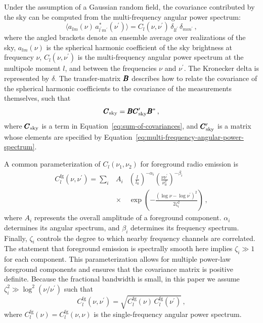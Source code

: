 \begin{bibunit}
Under the assumption of a Gaussian random field, the covariance contributed by the sky can be
computed from the multi-frequency angular power spectrum:
\begin{equation}\label{eq:multi-frequency-angular-power-spectrum}
    \langle a_{lm}(\nu) \, a_{l^\prime m^\prime}^*(\nu^\prime)\rangle
        = C_l(\nu, \nu^\prime) \, \delta_{ll^\prime} \, \delta_{mm^\prime}\,,
\end{equation}
where the angled brackets denote an ensemble average over realizations of the sky, $a_{lm}(\nu)$ is
the spherical harmonic coefficient of the sky brightness at frequency $\nu$, $C_l(\nu, \nu^\prime)$
is the multi-frequency angular power spectrum at the multipole moment $l$, and between the
frequencies $\nu$ and $\nu^\prime$. The Kronecker delta is represented by $\delta$.  The
transfer-matrix $\pmb B$ describes how to relate the covariance of the spherical harmonic coefficients
to the covariance of the measurements themselves, such that
\begin{equation}\label{eq:maps-to-covariance}
    \pmb C_\text{sky} = \pmb B \pmb C^\prime_\text{sky} \pmb B^*\,,
\end{equation}
where $\pmb C_\text{sky}$ is a term in Equation~\ref{eq:sum-of-covariances}, and $\pmb
C^\prime_\text{sky}$ is a matrix whose elements are specified by
Equation~\ref{eq:multi-frequency-angular-power-spectrum}.

A common parameterization of $C_l(\nu_1, \nu_2)$ for foreground radio emission is
\citep{2005ApJ...625..575S}
\begin{eqnarray}\label{eq:cforeground}
    C_l^\text{fg}(\nu, \nu^\prime) =
    \sum_i &A_i& \left(\frac{l}{l_0}\right)^{-\alpha_i}
                 \left(\frac{\nu\nu^\prime}{\nu_0^2}\right)^{-\beta_i} \nonumber \\
           &\times&\exp\left(-\frac{(\log\nu-\log\nu^\prime)^2}{2\zeta_i^2}\right)\,,
\end{eqnarray}
where $A_i$ represents the overall amplitude of a foreground component.  $\alpha_i$ determines its
angular spectrum, and $\beta_i$ determines its frequency spectrum. Finally, $\zeta_i$ controls the
degree to which nearby frequency channels are correlated. The statement that foreground emission is
spectrally smooth here implies $\zeta_i \gg 1$ for each component. This parameterization allows for
multiple power-law foreground components and ensures that the covariance matrix is positive
definite.  Because the fractional bandwidth is small, in this paper we assume $\zeta_i^2 \gg
\log^2(\nu/\nu^\prime)$ such that
\begin{equation}
    C_l^\text{fg}(\nu, \nu^\prime) = \sqrt{C_l^\text{fg}(\nu)\,C_l^\text{fg}(\nu^\prime)}\,,
\end{equation}
where $C_l^\text{fg}(\nu) = C_l^\text{fg}(\nu, \nu)$ is the single-frequency angular power spectrum.


\end{bibunit}
